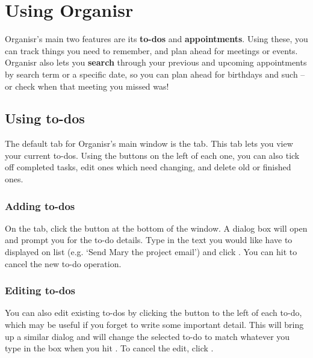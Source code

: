 \section{Using Organisr}

Organisr's main two features are its \textbf{to-dos} and \textbf{appointments}.
Using these, you can track things you need to remember, and plan ahead for
meetings or events. Organisr also lets you \textbf{search} through your previous
and upcoming appointments by search term or a specific date, so you can plan
ahead for birthdays and such -- or check when that meeting you missed was!


\subsection{Using to-dos}


The default tab for Organisr's main window is the  tab. This tab
lets you view your current to-dos. Using the buttons on the left of each one,
you can also tick off completed tasks, edit ones which need changing, and delete
old or finished ones.


\subsubsection{Adding to-dos}


On the  tab, click the  button at the bottom
of the window. A dialog box will open and prompt you for the to-do details. Type
in the text you would like have to displayed on list (e.g. `Send Mary the
project email') and click . You can hit  to cancel
the new to-do operation.



\subsubsection{Editing to-dos}


You can also edit existing to-dos by clicking the  button to the left
of each to-do, which may be useful if you forget to write some important detail.
This will bring up a similar dialog and will change the selected to-do to match
whatever you type in the box when you hit . To cancel the edit,
click .


